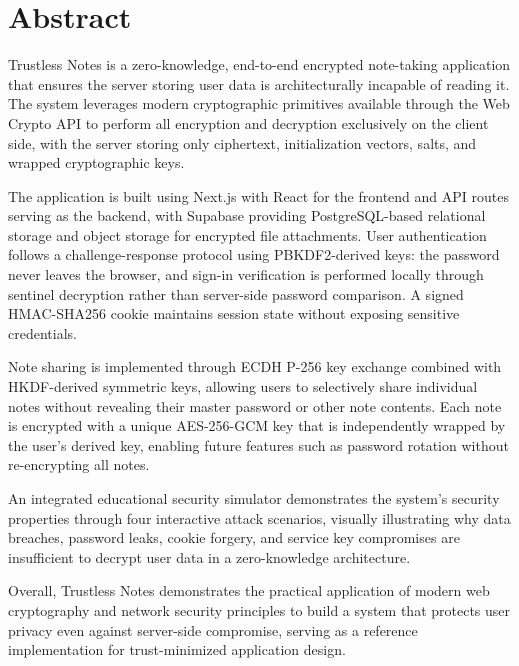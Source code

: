 
\newpage
\chapter*{Abstract}

Trustless Notes is a zero-knowledge, end-to-end encrypted note-taking application that ensures the server storing user data is architecturally incapable of reading it. The system leverages modern cryptographic primitives available through the Web Crypto API to perform all encryption and decryption exclusively on the client side, with the server storing only ciphertext, initialization vectors, salts, and wrapped cryptographic keys.

The application is built using Next.js with React for the frontend and API routes serving as the backend, with Supabase providing PostgreSQL-based relational storage and object storage for encrypted file attachments. User authentication follows a challenge-response protocol using PBKDF2-derived keys: the password never leaves the browser, and sign-in verification is performed locally through sentinel decryption rather than server-side password comparison. A signed HMAC-SHA256 cookie maintains session state without exposing sensitive credentials.

Note sharing is implemented through ECDH P-256 key exchange combined with HKDF-derived symmetric keys, allowing users to selectively share individual notes without revealing their master password or other note contents. Each note is encrypted with a unique AES-256-GCM key that is independently wrapped by the user's derived key, enabling future features such as password rotation without re-encrypting all notes.

An integrated educational security simulator demonstrates the system's security properties through four interactive attack scenarios, visually illustrating why data breaches, password leaks, cookie forgery, and service key compromises are insufficient to decrypt user data in a zero-knowledge architecture.

Overall, Trustless Notes demonstrates the practical application of modern web cryptography and network security principles to build a system that protects user privacy even against server-side compromise, serving as a reference implementation for trust-minimized application design.
